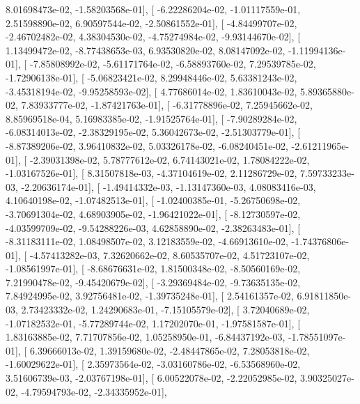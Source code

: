 \documentclass{article}
\begin{document}
          8.01698473e-02,  -1.58203568e-01],
       [ -6.22286204e-02,  -1.01117559e-01,   2.51598890e-02,
          6.90597544e-02,  -2.50861552e-01],
       [ -4.84499707e-02,  -2.46702482e-02,   4.38304530e-02,
         -4.75274984e-02,  -9.93144670e-02],
       [  1.13499472e-02,  -8.77438653e-03,   6.93530820e-02,
          8.08147092e-02,  -1.11994136e-01],
       [ -7.85808992e-02,  -5.61171764e-02,  -6.58893760e-02,
          7.29539785e-02,  -1.72906138e-01],
       [ -5.06823421e-02,   8.29948446e-02,   5.63381243e-02,
         -3.45318194e-02,  -9.95258593e-02],
       [  4.77686014e-02,   1.83610043e-02,   5.89365880e-02,
          7.83933777e-02,  -1.87421763e-01],
       [ -6.31778896e-02,   7.25945662e-02,   8.85969518e-04,
          5.16983385e-02,  -1.91525764e-01],
       [ -7.90289284e-02,  -6.08314013e-02,  -2.38329195e-02,
          5.36042673e-02,  -2.51303779e-01],
       [ -8.87389206e-02,   3.96410832e-02,   5.03326178e-02,
         -6.08240451e-02,  -2.61211965e-01],
       [ -2.39031398e-02,   5.78777612e-02,   6.74143021e-02,
          1.78084222e-02,  -1.03167526e-01],
       [  8.31507818e-03,  -4.37104619e-02,   2.11286729e-02,
          7.59733233e-03,  -2.20636174e-01],
       [ -1.49414332e-03,  -1.13147360e-03,   4.08083416e-03,
          4.10640198e-02,  -1.07482513e-01],
       [ -1.02400385e-01,  -5.26750698e-02,  -3.70691304e-02,
          4.68903905e-02,  -1.96421022e-01],
       [ -8.12730597e-02,  -4.03599709e-02,  -9.54288226e-03,
          4.62858890e-02,  -2.38263483e-01],
       [ -8.31183111e-02,   1.08498507e-02,   3.12183559e-02,
         -4.66913610e-02,  -1.74376806e-01],
       [ -4.57413282e-03,   7.32620662e-02,   8.60535707e-02,
          4.51723107e-02,  -1.08561997e-01],
       [ -8.68676631e-02,   1.81500348e-02,  -8.50560169e-02,
          7.21990478e-02,  -9.45420679e-02],
       [ -3.29369484e-02,  -9.73635135e-02,   7.84924995e-02,
          3.92756481e-02,  -1.39735248e-01],
       [  2.54161357e-02,   6.91811850e-03,   2.73423332e-02,
          1.24290683e-01,  -7.15105579e-02],
       [  3.72040689e-02,  -1.07182532e-01,  -5.77289744e-02,
          1.17202070e-01,  -1.97581587e-01],
       [  1.83163885e-02,   7.71707856e-02,   1.05258950e-01,
         -6.84437192e-03,  -1.78551097e-01],
       [  6.39666013e-02,   1.39159680e-02,  -2.48447865e-02,
          7.28053818e-02,  -1.60029622e-01],
       [  2.35973564e-02,  -3.03160786e-02,  -6.53568960e-02,
          3.51606739e-03,  -2.03767198e-01],
       [  6.00522078e-02,  -2.22052985e-02,   3.90325027e-02,
         -4.79594793e-02,  -2.34335952e-01],
\end{document}
